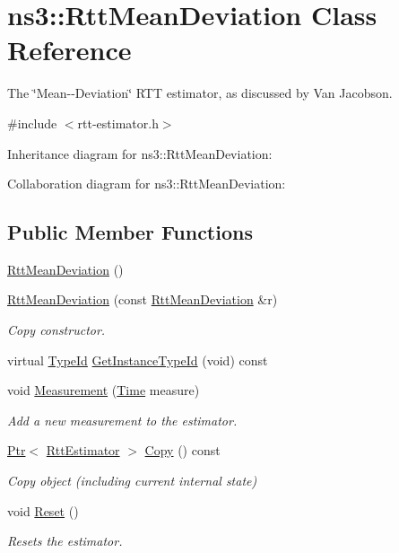 \hypertarget{classns3_1_1RttMeanDeviation}{}\section{ns3\+:\+:Rtt\+Mean\+Deviation Class Reference}
\label{classns3_1_1RttMeanDeviation}


The \char`\"{}\+Mean-\/-\/\+Deviation\char`\"{} R\+TT estimator, as discussed by Van Jacobson.  




{\ttfamily \#include $<$rtt-\/estimator.\+h$>$}



Inheritance diagram for ns3\+:\+:Rtt\+Mean\+Deviation\+:


Collaboration diagram for ns3\+:\+:Rtt\+Mean\+Deviation\+:
\subsection*{Public Member Functions}
\begin{DoxyCompactItemize}
\item 
\hyperlink{classns3_1_1RttMeanDeviation_a64572fa6806f3da4cf044339c451076e}{Rtt\+Mean\+Deviation} ()
\item 
\hyperlink{classns3_1_1RttMeanDeviation_a9adcf6cb394eb2b5b7169f2fcf0085e6}{Rtt\+Mean\+Deviation} (const \hyperlink{classns3_1_1RttMeanDeviation}{Rtt\+Mean\+Deviation} \&r)
\begin{DoxyCompactList}\small\item\em Copy constructor. \end{DoxyCompactList}\item 
virtual \hyperlink{classns3_1_1TypeId}{Type\+Id} \hyperlink{classns3_1_1RttMeanDeviation_a241d420c7ad132a39bd7901de8c63ade}{Get\+Instance\+Type\+Id} (void) const 
\item 
void \hyperlink{classns3_1_1RttMeanDeviation_a3e727dacebe30903b9c7ea084564c4e8}{Measurement} (\hyperlink{classns3_1_1Time}{Time} measure)
\begin{DoxyCompactList}\small\item\em Add a new measurement to the estimator. \end{DoxyCompactList}\item 
\hyperlink{classns3_1_1Ptr}{Ptr}$<$ \hyperlink{classns3_1_1RttEstimator}{Rtt\+Estimator} $>$ \hyperlink{classns3_1_1RttMeanDeviation_af5c036fd0092fbb7f19cb5cc5646d505}{Copy} () const 
\begin{DoxyCompactList}\small\item\em Copy object (including current internal state) \end{DoxyCompactList}\item 
void \hyperlink{classns3_1_1RttMeanDeviation_a5a215a2ed1380c064cb38dbd09c88677}{Reset} ()
\begin{DoxyCompactList}\small\item\em Resets the estimator. \end{DoxyCompactList}\end{DoxyCompactItemize}
